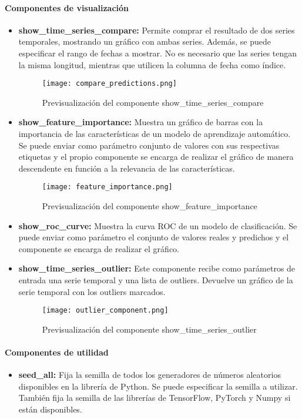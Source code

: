 \paragraph{Componentes de visualización}
\begin{itemize}
    \item \textbf{show\_time\_series\_compare:} Permite comprar el resultado de dos series temporales,
    mostrando un gráfico con ambas series. Además, se puede especificar el rango de fechas a mostrar.
    No es necesario que las series tengan la misma longitud, mientras que utilicen la columna de fecha
    como índice.
    \begin{figure}[ht]
        \centering
        \texttt{[image: compare\_predictions.png]}
        \caption{Previsualización del componente show\_time\_series\_compare}
        \label{fig:compare_predictions}
    \end{figure}
    \item \textbf{show\_feature\_importance:} Muestra un gráfico de barras con la importancia de las
    características de un modelo de aprendizaje automático. Se puede enviar como parámetro conjunto 
    de valores con sus respectivas etiquetas y el propio componente se encarga de realizar el gráfico
    de manera descendente en función a la relevancia de las características.
    \begin{figure}[ht]
        \centering
        \texttt{[image: feature\_importance.png]}
        \caption{Previsualización del componente show\_feature\_importance}
        \label{fig:feature_importance}
    \end{figure}
    \item \textbf{show\_roc\_curve:} Muestra la curva ROC de un modelo de clasificación. Se puede
    enviar como parámetro el conjunto de valores reales y predichos y el componente se encarga de
    realizar el gráfico.
    \item \textbf{show\_time\_series\_outlier:} Este componente recibe como parámetros de entrada
    una serie temporal y una lista de outliers. Devuelve un gráfico de la serie temporal con los
    outliers marcados. 
    \begin{figure}[ht]
        \centering
        \texttt{[image: outlier\_component.png]}
        \caption{Previsualización del componente show\_time\_series\_outlier}
        \label{fig:outlier_component}
    \end{figure}
\end{itemize}


\paragraph{Componentes de utilidad}
\begin{itemize}
    \item \textbf{seed\_all:} Fija la semilla de todos los generadores de números aleatorios
    disponibles en la librería de Python. Se puede especificar la semilla a utilizar. También
    fija la semilla de las librerías de TensorFlow, PyTorch y Numpy si están disponibles.
\end{itemize}    
